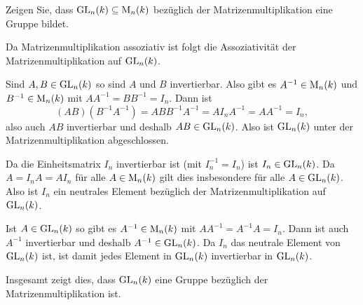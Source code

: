 \begin{question}
 Zeigen Sie, dass $\operatorname{GL}_n(k) \subseteq \operatorname{M}_n(k)$ bezüglich der Matrizenmultiplikation eine Gruppe bildet.
\end{question}
\begin{solution}
 Da Matrizenmultiplikation assoziativ ist folgt die Assoziativität der Matrizenmultiplikation auf $\operatorname{GL}_n(k)$.
 
 Sind $A, B \in \operatorname{GL}_n(k)$ so sind $A$ und $B$ invertierbar. Also gibt es $A^{-1} \in \operatorname{M}_n(k)$ und $B^{-1} \in \operatorname{M}_n(k)$ mit $A A^{-1} = B B^{-1} = I_n$. Dann ist
 \[
  (AB) (B^{-1} A^{-1})
  = A B B^{-1} A^{-1}
  = A I_n A^{-1}
  = A A^{-1}
  = I_n,
 \]
 also auch $AB$ invertierbar und deshalb $AB \in \operatorname{GL}_n(k)$. Also ist $\operatorname{GL}_n(k)$ unter der Matrizenmultiplikation abgeschlossen.
 
 Da die Einheitsmatrix $I_n$ invertierbar ist (mit $I_n^{-1} = I_n$) ist $I_n \in \operatorname{GL}_n(k)$. Da $A = I_n A = A I_n$ für alle $A \in \operatorname{M}_n(k)$ gilt dies insbesondere für alle $A \in \operatorname{GL}_n(k)$. Also ist $I_n$ ein neutrales Element bezüglich der Matrizenmultiplikation auf $\operatorname{GL}_n(k)$.
 
 Ist $A \in \operatorname{GL}_n(k)$ so gibt es $A^{-1} \in \operatorname{M}_n(k)$ mit $A A^{-1} = A^{-1} A = I_n$. Dann ist auch $A^{-1}$ invertierbar und deshalb $A^{-1} \in \operatorname{GL}_n(k)$. Da $I_n$ das neutrale Element von $\operatorname{GL}_n(k)$ ist, ist damit jedes Element in $\operatorname{GL}_n(k)$ invertierbar in $\operatorname{GL}_n(k)$.
 
 Insgesamt zeigt dies, dass $\operatorname{GL}_n(k)$ eine Gruppe bezüglich der Matrizenmultiplikation ist.
\end{solution}


